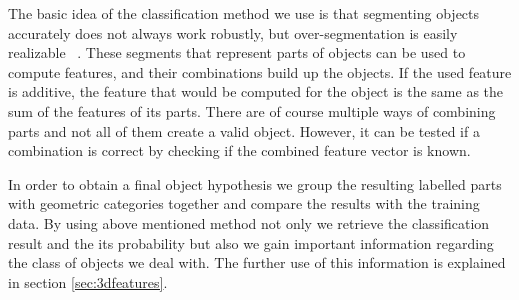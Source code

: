 The basic idea of the classification method we use is that
segmenting objects accurately does not always work
robustly, but over-segmentation is easily realizable ~\cite{soupofsegments,Lai_Fox_2010,mozos11furniture}.
These segments that represent parts of objects can be used
to compute features, and their combinations build up the
objects. If the used feature is additive, the feature that
would be computed for the object is the same as the sum
of the features of its parts.
There are of course multiple ways of combining parts
and not all of them create a valid object. However, it can be
tested if a combination is correct by checking if the
combined feature vector is known. 

In order to obtain a final object hypothesis we group the resulting labelled parts with geometric categories together and compare the results with the training data. By using above mentioned method not only we retrieve the classification result and the its probability but also we gain important information regarding the class of objects we deal with. The further use of this information is explained in section \ref{sec:3dfeatures}.
















